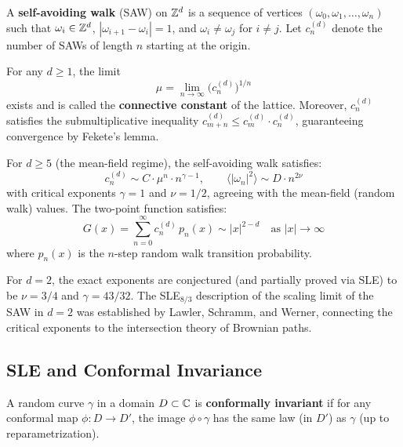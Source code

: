 \begin{definition}
A \textbf{self-avoiding walk} (SAW) on $\mathbb{Z}^d$ is a sequence of vertices $(\omega_0, \omega_1, \ldots, \omega_n)$ such that $\omega_i \in \mathbb{Z}^d$, $|\omega_{i+1} - \omega_i| = 1$, and $\omega_i \neq \omega_j$ for $i \neq j$. Let $c_n^{(d)}$ denote the number of SAWs of length $n$ starting at the origin.
\end{definition}

\begin{theorem}
For any $d \geq 1$, the limit
\[
\mu = \lim_{n \to \infty} \bigl(c_n^{(d)}\bigr)^{1/n}
\]
exists and is called the \textbf{connective constant} of the lattice. Moreover, $c_n^{(d)}$ satisfies the submultiplicative inequality $c_{m+n}^{(d)} \leq c_m^{(d)} \cdot c_n^{(d)}$, guaranteeing convergence by Fekete's lemma.
\end{theorem}

\begin{theorem}
For $d \geq 5$ (the mean-field regime), the self-avoiding walk satisfies:
\[
c_n^{(d)} \sim C \cdot \mu^n \cdot n^{\gamma - 1}, \qquad \langle |\omega_n|^2 \rangle \sim D \cdot n^{2\nu}
\]
with critical exponents $\gamma = 1$ and $\nu = 1/2$, agreeing with the mean-field (random walk) values. The two-point function satisfies:
\[
G(x) = \sum_{n=0}^{\infty} c_n^{(d)} \, p_n(x) \sim |x|^{2-d} \quad \text{as } |x| \to \infty
\]
where $p_n(x)$ is the $n$-step random walk transition probability.
\end{theorem}

\begin{remark}
For $d = 2$, the exact exponents are conjectured (and partially proved via SLE) to be $\nu = 3/4$ and $\gamma = 43/32$. The SLE$_{8/3}$ description of the scaling limit of the SAW in $d = 2$ was established by Lawler, Schramm, and Werner, connecting the critical exponents to the intersection theory of Brownian paths.
\end{remark}

\subsection{SLE and Conformal Invariance}

\begin{definition}
A random curve $\gamma$ in a domain $D \subset \mathbb{C}$ is \textbf{conformally invariant} if for any conformal map $\phi: D \to D'$, the image $\phi \circ \gamma$ has the same law (in $D'$) as $\gamma$ (up to reparametrization).
\end{definition}


